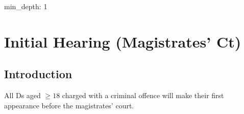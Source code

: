 \documentclass[
]{article}
\author{}
\date{}
\newenvironment{Shaded}{}{}
\newcommand{\NormalTok}[1]{#1}
\begin{document}
{
\setcounter{tocdepth}{3}
\tableofcontents
}
\begin{Shaded}
\begin{Highlighting}[]
\NormalTok{min\_depth: 1}
\end{Highlighting}
\end{Shaded}

\hypertarget{initial-hearing-magistrates-ct}{%
\section{Initial Hearing (Magistrates'
Ct)}\label{initial-hearing-magistrates-ct}}

\hypertarget{introduction}{%
\subsection{Introduction}\label{introduction}}

All Ds aged \(\geq 18\) charged with a criminal offence will make their
first appearance before the magistrates' court.
\end{document}
